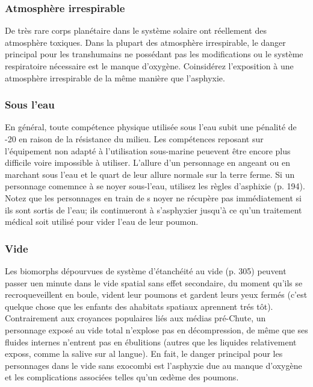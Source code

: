 \subsubsection{Atmosphère irrespirable} 

De très rare corps planétaire dans le système solaire ont réellement des atmosphère toxiques. Dans la plupart des atmosphère irrespirable, le danger principal pour les transhumains ne possédant pas les modifications ou le système respiratoire nécessaire est le manque d'oxygène. Coinsidérez l'exposition à une atmosphère irrespirable de la même manière que l'asphyxie. 

\subsubsection{Sous l'eau} 

En général, toute compétence physique utilisée sous l'eau subit une pénalité de -20 en raison de la résistance du milieu. Les compétences reposant sur l'équipement non adapté à l'utilisation sous-marine peuevent être encore plus difficile voire impossible à utiliser. L'allure d'un personnage en angeant ou en marchant sous l'eau et le quart de leur allure normale sur la terre ferme. Si un personnage comemnce à se noyer sous-l'eau, utilisez les règles d'asphixie (p. 194). Notez que les personnages en train de s noyer ne récupère pas immédiatement si ils sont sortis de l'eau; ils continueront à s'asphyxier jusqu'à ce qu'un traitement médical soit utilisé pour vider l'eau de leur poumon. 

\subsubsection{Vide} 

Les biomorphs dépourvues de système d'étanchéité au vide (p. 305) peuvent passer uen minute dans le vide spatial sans effet secondaire, du moment qu'ils se recroqueveillent en boule, vident leur poumons et gardent leurs yeux fermés (c'est quelque chose que les enfants des ahabitats spatiaux aprennent trés tôt).
Contrairement aux croyances populaires liés aux médias pré-Chute, un personnage exposé au vide total n'explose pas en décompression, de même que ses fluides internes n'entrent pas en ébulitions (autres que les liquides relativement exposs, comme la salive sur al langue).
En fait, le danger principal pour les personnages dans le vide sans exocombi est l'asphyxie due au manque d'oxygène et les complications associées telles qu'un œdème des poumons. 


